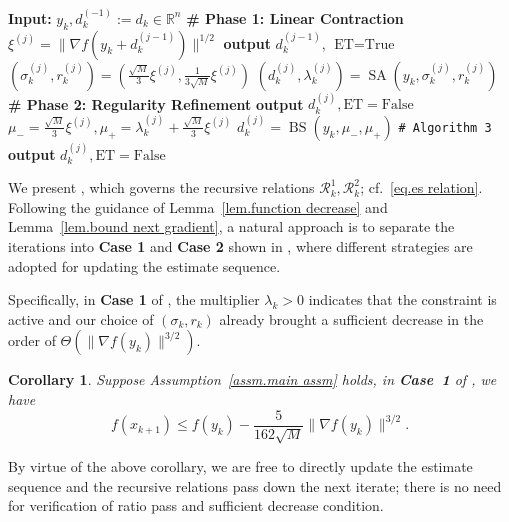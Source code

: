 \documentclass{article}
\theoremstyle{plain}
\newtheorem{corollary}[theorem]{Corollary}
\theoremstyle{definition}
\theoremstyle{remark}
\begin{document}
\begin{algorithm}[ht]  \caption{Local Detection for ATR (LD)}\label{alg.rr}
    \begin{algorithmic}[1]
        \STATE \textbf{Input: } $y_k,d_k^{(-1)} := d_k\in\mathbb{R}^n$
        \STATE \textbf{\# Phase 1: Linear Contraction}
        \STATE $\xi^{(j)} = \|\nabla f(y_k+d_k^{(j-1)})\|^{1/2}$
        \STATE \textbf{output} $d_k^{(j-1)}$, $\textrm{ET}=\text{True}$
        \ENDIF
        \STATE $(\sigma_k^{(j)},r_k^{(j)}) = (\frac{\sqrt{M}}{3}\xi^{(j)},\frac{1}{3\sqrt{M}}\xi^{(j)})$
        \STATE $(d_k^{(j)},\lambda_k^{(j)})=\operatorname{SA}(y_k,\sigma_k^{(j)},r_k^{(j)})$
        \STATE \textbf{\# Phase 2: Regularity Refinement}
         \label{line.bisection}
        \STATE \textbf{output } $d_k^{(j)}, \textrm{ET}=\text{False}$ \label{line.zero multiplier 1}
        \STATE $\mu_- = \tfrac{\sqrt{M}}{3}\xi^{(j)}, \mu_+ = \lambda_k^{(j)}+\tfrac{\sqrt{M}}{3}\xi^{(j)}$ \label{line.bracketing}
        \STATE $d_k^{(j)} = \operatorname{BS}(y_k,\mu_-,\mu_+)$ \label{line.zero multiplier 2} \texttt{\# Algorithm 3}
        \STATE \textbf{output } $d_k^{(j)}, \textrm{ET}=\text{False}$
        \ENDIF \label{line.endbisection}
        \ENDFOR
    \end{algorithmic}
\end{algorithm}

We present , which governs the recursive relations $\mathcal{R}_k^1,\mathcal{R}_k^2$; cf.~\eqref{eq.es relation}. Following the guidance of Lemma~\ref{lem.function decrease} and Lemma~\ref{lem.bound next gradient}, a natural approach is to separate the iterations into \textbf{Case 1} and \textbf{Case 2} shown in , where different strategies are adopted for updating the estimate sequence.

Specifically, in \textbf{Case 1} of , the multiplier $\lambda_k>0$ indicates that the constraint is active and our choice of $(\sigma_k,r_k)$ already brought a sufficient decrease in the order of  $\Theta(\|\nabla f(y_k)\|^{3/2})$.
\begin{corollary}\label{coro.function value decrease}
    Suppose Assumption~\ref{assm.main assm} holds, in \textbf{Case~1} of , we have
    \begin{equation}
        \label{eq.decrease of order 1.5}
        f(x_{k+1}) \leq f(y_k)-\frac{5}{162\sqrt{M}}\|\nabla f(y_k)\|^{3/2}.
    \end{equation}
\end{corollary}
By virtue of the above corollary, we are free to directly update the estimate sequence and the recursive relations pass down the next iterate; there is no need for verification of ratio pass and sufficient decrease condition.
\end{document}
